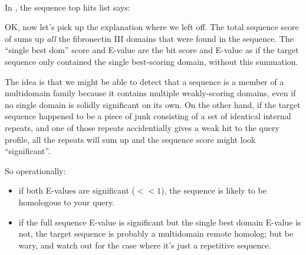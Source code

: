    \vspace{1ex}
    \\
   \vspace{1ex}

In , the sequence top hits list says:


OK, now let's pick up the explanation where we left off. The total
sequence score of \SFSbitscore{} sums up \emph{all} the fibronectin III domains
that were found in the  sequence. The ``single best
dom'' score and E-value are the bit score and E-value as if the target
sequence only contained the single best-scoring domain, without this
summation.

The idea is that we might be able to detect that a sequence is a
member of a multidomain family because it contains multiple
weakly-scoring domains, even if no single domain is solidly
significant on its own.  On the other hand, if the target sequence
happened to be a piece of junk consisting of a set of identical
internal repeats, and one of those repeats accidentially gives a weak
hit to the query profile, all the repeats will sum up and the sequence
score might look ``significant''.

So operationally:
\begin{itemize}
\item if both E-values are significant ($<<1$), the sequence is likely
      to be homologous to your query.
\item if the full sequence E-value is significant but the single best domain
      E-value is not, the target sequence is probably a multidomain remote 
      homolog; but be wary, and watch out for the case where it's just a repetitive
      sequence.
\end{itemize}

